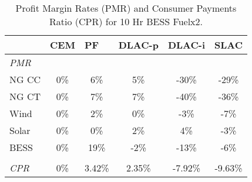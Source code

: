 \documentclass{article}
\begin{document}
\begin{table}[ht]
\centering
\begin{tabular}{lccccc}
\toprule
& \multicolumn{1}{l}{\textbf{CEM}} 
& \multicolumn{1}{l}{\textbf{PF}} 
& \multicolumn{1}{l}{\textbf{DLAC-p}} 
& \multicolumn{1}{l}{\textbf{DLAC-i}} 
& \multicolumn{1}{l}{\textbf{SLAC}} 
 \\ \hline
\midrule
\textit{PMR} & & & & \\
\quad NG CC & 0\% & 6\% & 5\% & -30\% & -29\% \\
\quad NG CT & 0\% & 7\% & 7\% & -40\% & -36\% \\
\quad Wind & 0\% & 2\% & 0\% & -3\% & -7\% \\
\quad Solar & 0\% & 0\% & 2\% & 4\% & -3\% \\
\quad BESS & 0\% & 19\% & -2\% & -13\% & -6\% \\
& & & & \\
\textit{CPR} & 0\% & 3.42\% & 2.35\% & -7.92\% & -9.63\% \\
\bottomrule
\end{tabular}
\caption{Profit Margin Rates (PMR) and Consumer Payments Ratio (CPR) for 10 Hr BESS Fuelx2.}
\label{table:10_Hr_BESS_Fuelx2_pmr}
\end{table}
\end{document}
